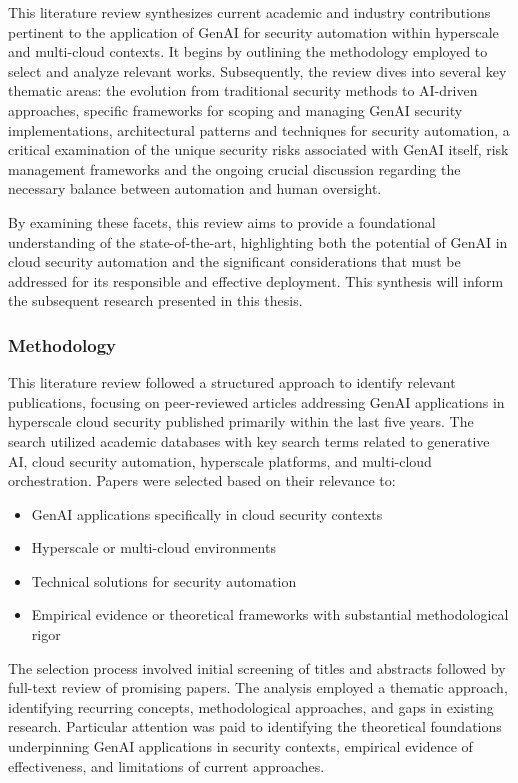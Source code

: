 This literature review synthesizes current academic and industry contributions pertinent to the application of GenAI for security automation within hyperscale and multi-cloud contexts. It begins by outlining the methodology employed to select and analyze relevant works. Subsequently, the review dives into several key thematic areas: the evolution from traditional security methods to AI-driven approaches, specific frameworks for scoping and managing GenAI security implementations, architectural patterns and techniques for security automation, a critical examination of the unique security risks associated with GenAI itself, risk management frameworks and the ongoing crucial discussion regarding the necessary balance between automation and human oversight.

By examining these facets, this review aims to provide a foundational understanding of the state-of-the-art, highlighting both the potential of GenAI in cloud security automation and the significant considerations that must be addressed for its responsible and effective deployment. This synthesis will inform the subsequent research presented in this thesis.

\subsubsection{Methodology} %
\label{sec:Methodology}

This literature review followed a structured approach to identify relevant publications, focusing on peer-reviewed articles addressing GenAI applications in hyperscale cloud security published primarily within the last five years. The search utilized academic databases with key search terms related to generative AI, cloud security automation, hyperscale platforms, and multi-cloud orchestration.
Papers were selected based on their relevance to:

\begin{itemize}
\item GenAI applications specifically in cloud security contexts
\item Hyperscale or multi-cloud environments
\item Technical solutions for security automation
\item Empirical evidence or theoretical frameworks with substantial methodological rigor
\end{itemize}

The selection process involved initial screening of titles and abstracts followed by full-text review of promising papers. The analysis employed a thematic approach, identifying recurring concepts, methodological approaches, and gaps in existing research. Particular attention was paid to identifying the theoretical foundations underpinning GenAI applications in security contexts, empirical evidence of effectiveness, and limitations of current approaches.

